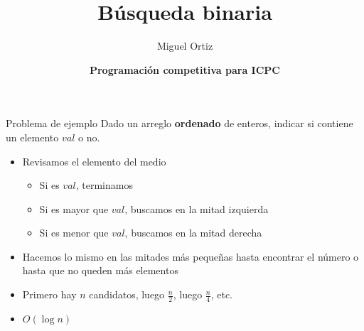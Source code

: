 \documentclass[10pt]{beamer}
\title{Búsqueda binaria}
\author{Miguel Ortiz}
\institute{Abril 2023 - Cochabamba, Bolivia}
\date{\textbf{Programación competitiva para ICPC}}
\newcommand{\bi}{\begin{itemize}}
\newcommand{\ei}{\end{itemize}}
\begin{document}
\maketitle

\begin{frame}{Problema de ejemplo}
  Dado un arreglo \textbf{ordenado} de enteros, indicar si contiene un elemento \textbf{$val$} o no.
  \vspace{20pt}

  \bi
    \item<2-> Revisamos el elemento del medio
    \bi
      \item<2-> Si es $val$, terminamos
      \item<2-> Si es mayor que $val$, buscamos en la mitad izquierda
      \item<2-> Si es menor que $val$, buscamos en la mitad derecha
    \ei
    \item<3-> Hacemos lo mismo en las mitades más pequeñas hasta encontrar el número o hasta que no queden más elementos
    \item<4-> Primero hay $n$ candidatos, luego $\frac{n}{2}$, luego $\frac{n}{4}$, etc.
    \item<4-> $O(\log n)$
  \ei
\end{frame}
\end{document}
